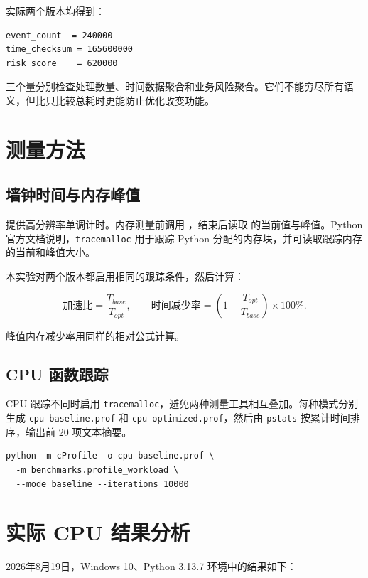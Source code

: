\documentclass[UTF8,zihao=-4,a4paper]{ctexart}
\newcommand{\code}[1]{\texttt{#1}}
\begin{document}
实际两个版本均得到：

\begin{lstlisting}[style=shellstyle]
event_count  = 240000
time_checksum = 165600000
risk_score    = 620000
\end{lstlisting}

三个量分别检查处理数量、时间数据聚合和业务风险聚合。它们不能穷尽所有语义，但比只比较总耗时更能防止优化改变功能。

\section{测量方法}

\subsection{墙钟时间与内存峰值}

 提供高分辨率单调计时。内存测量前调用 ，结束后读取  的当前值与峰值。Python 官方文档说明，\code{tracemalloc} 用于跟踪 Python 分配的内存块，并可读取跟踪内存的当前和峰值大小\cite{python-tracemalloc}。

本实验对两个版本都启用相同的跟踪条件，然后计算：

\[
\text{加速比}=\frac{T_{base}}{T_{opt}},\qquad
\text{时间减少率}=\left(1-\frac{T_{opt}}{T_{base}}\right)\times100\%.
\]

峰值内存减少率用同样的相对公式计算。

\subsection{CPU 函数跟踪}

CPU 跟踪不同时启用 \code{tracemalloc}，避免两种测量工具相互叠加。每种模式分别生成 \code{cpu-baseline.prof} 和 \code{cpu-optimized.prof}，然后由 \code{pstats} 按累计时间排序，输出前 20 项文本摘要。

\begin{lstlisting}[style=shellstyle]
python -m cProfile -o cpu-baseline.prof \
  -m benchmarks.profile_workload \
  --mode baseline --iterations 10000
\end{lstlisting}

\section{实际 CPU 结果分析}

2026年8月19日，Windows 10、Python 3.13.7 环境中的结果如下：
\end{document}
